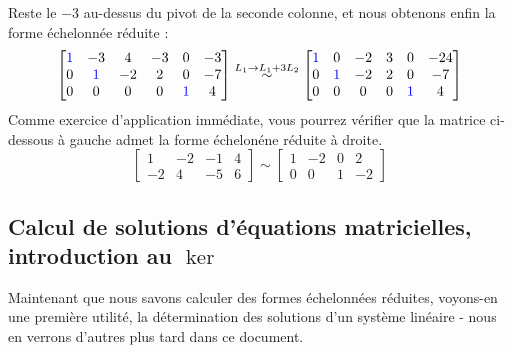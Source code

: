 \documentclass{article}
\begin{document}
Reste le $-3$ au-dessus du pivot de la seconde colonne, et nous obtenons enfin la forme échelonnée réduite :
$$
\begin{bmatrix}
 \color{blue}1 & -3 &  4 & -3 &  0 & -3\\
 0 & \color{blue}1 &  -2 & 2 &  0 &  -7\\
 0 &  0 & 0 &  0 &  \color{blue}1 & 4
\end{bmatrix}
\overset{L_1 \to L_1 + 3L_2}{\sim}
\begin{bmatrix}
 \color{blue}1 & 0 &  -2 & 3 &  0 & -24\\
 0 & \color{blue}1 &  -2 & 2 &  0 &  -7\\
 0 &  0 & 0 &  0 &  \color{blue}1 & 4
\end{bmatrix}
$$
Comme exercice d'application immédiate, vous pourrez vérifier que la matrice ci-dessous à gauche admet la forme échelonéne réduite à droite.
$$
\begin{bmatrix}
1 & -2 & -1 & 4\\
-2 & 4 & -5 & 6
\end{bmatrix}
\sim
\begin{bmatrix}
1 & -2 & 0 & 2\\
0 & 0 & 1 & -2
\end{bmatrix}
$$

\subsection{Calcul de solutions d'équations matricielles, introduction au $\ker$}
\noindent Maintenant que nous savons calculer des formes échelonnées réduites, voyons-en une première utilité, la détermination des solutions d'un système linéaire - nous en verrons d'autres plus tard dans ce document. \\
\end{document}

